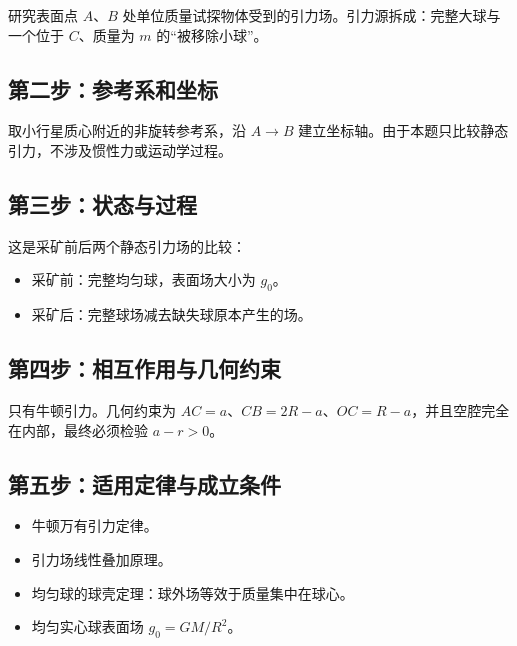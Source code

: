 \documentclass[
  11pt,
  UTF8]{ctexart}
\providecommand{\tightlist}{%
  \setlength{\itemsep}{0pt}\setlength{\parskip}{0pt}}
\begin{document}
研究表面点 \(A\)、\(B\)
处单位质量试探物体受到的引力场。引力源拆成：完整大球与一个位于
\(C\)、质量为 \(m\) 的``被移除小球''。

\hypertarget{ux7b2cux4e8cux6b65ux53c2ux8003ux7cfbux548cux5750ux6807}{%
\subsection{第二步：参考系和坐标}\label{ux7b2cux4e8cux6b65ux53c2ux8003ux7cfbux548cux5750ux6807}}

取小行星质心附近的非旋转参考系，沿 \(A\to B\)
建立坐标轴。由于本题只比较静态引力，不涉及惯性力或运动学过程。

\hypertarget{ux7b2cux4e09ux6b65ux72b6ux6001ux4e0eux8fc7ux7a0b}{%
\subsection{第三步：状态与过程}\label{ux7b2cux4e09ux6b65ux72b6ux6001ux4e0eux8fc7ux7a0b}}

这是采矿前后两个静态引力场的比较：

\begin{itemize}
\tightlist
\item
  采矿前：完整均匀球，表面场大小为 \(g_0\)。
\item
  采矿后：完整球场减去缺失球原本产生的场。
\end{itemize}

\hypertarget{ux7b2cux56dbux6b65ux76f8ux4e92ux4f5cux7528ux4e0eux51e0ux4f55ux7ea6ux675f}{%
\subsection{第四步：相互作用与几何约束}\label{ux7b2cux56dbux6b65ux76f8ux4e92ux4f5cux7528ux4e0eux51e0ux4f55ux7ea6ux675f}}

只有牛顿引力。几何约束为
\(AC=a\)、\(CB=2R-a\)、\(OC=R-a\)，并且空腔完全在内部，最终必须检验
\(a-r>0\)。

\hypertarget{ux7b2cux4e94ux6b65ux9002ux7528ux5b9aux5f8bux4e0eux6210ux7acbux6761ux4ef6}{%
\subsection{第五步：适用定律与成立条件}\label{ux7b2cux4e94ux6b65ux9002ux7528ux5b9aux5f8bux4e0eux6210ux7acbux6761ux4ef6}}

\begin{itemize}
\tightlist
\item
  牛顿万有引力定律。
\item
  引力场线性叠加原理。
\item
  均匀球的球壳定理：球外场等效于质量集中在球心。
\item
  均匀实心球表面场 \(g_0=GM/R^2\)。
\end{itemize}
\end{document}
